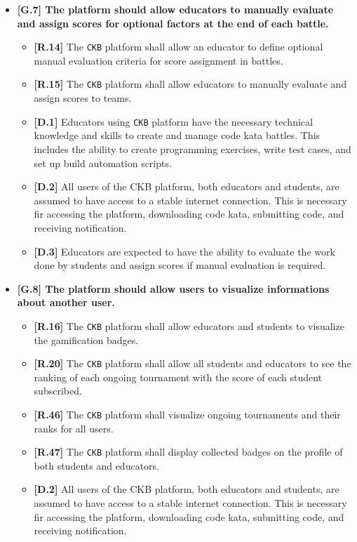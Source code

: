 \begin{itemize}
\begin{itemize}
        \end{itemize}

        \item \textbf{{[G.7]} The platform should allow educators to manually evaluate and assign scores for optional factors at the end of each battle. }
        \begin{itemize}
            \item \textbf{[R.14]} The \verb|CKB| platform shall allow an educator to define optional manual evaluation criteria for score assignment in battles.   
            \item \textbf{[R.15]} The \verb|CKB| platform shall allow educators to manually evaluate and assign scores to teams.
            \item \textbf{[D.1]} Educators using \verb|CKB| platform have the necessary technical knowledge and skills to create and manage code kata battles. 
            This includes the ability to create programming exercises, write test cases, and set up build automation scripts.
            \item \textbf{[D.2]} All users of the CKB platform, both educators and students, are assumed to have access to a stable internet connection. This is
            necessary fir accessing the platform, downloading code kata, submitting code, and receiving notification.
            \item \textbf{[D.3]} Educators are expected to have the ability to evaluate the work done by students and assign scores if manual evaluation is required.
        \end{itemize}

        \item \textbf{{[G.8]} The platform should allow users to visualize informations about another user. }
        \begin{itemize}
            \item \textbf{[R.16]} The \verb|CKB| platform shall allow educators and students to visualize the gamification badges.   
            \item \textbf{[R.20]} The \verb|CKB| platform shall allow all students and educators to see the ranking of each ongoing tournament with the score of each student subscribed.   
            \item \textbf{[R.46]} The \verb|CKB| platform shall visualize ongoing tournaments and their ranks for all users.
            \item \textbf{[R.47]} The \verb|CKB| platform shall display collected badges on the profile of both students and educators.    
            \item \textbf{[D.2]} All users of the CKB platform, both educators and students, are assumed to have access to a stable internet connection. This is
            necessary fir accessing the platform, downloading code kata, submitting code, and receiving notification.        \end{itemize}


\end{itemize}
